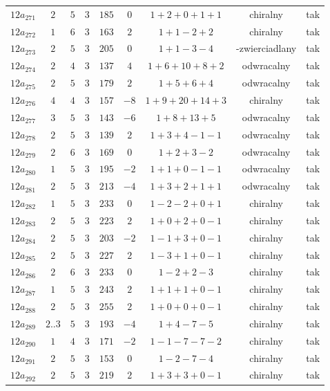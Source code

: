 \begin{longtable}{ccccccccc}
$12a_{271}$ & $2$ & $5$ & $3$ & $185$ & $0$ & $1+2+0+1+1$ & chiralny & tak \\
$12a_{272}$ & $1$ & $6$ & $3$ & $163$ & $2$ & $1+1-2+2$ & chiralny & tak \\
$12a_{273}$ & $2$ & $5$ & $3$ & $205$ & $0$ & $1+1-3-4$ & -zwierciadlany & tak \\
$12a_{274}$ & $2$ & $4$ & $3$ & $137$ & $4$ & $1+6+10+8+2$ & odwracalny & tak \\
$12a_{275}$ & $2$ & $5$ & $3$ & $179$ & $2$ & $1+5+6+4$ & odwracalny & tak \\
$12a_{276}$ & $4$ & $4$ & $3$ & $157$ & $-8$ & $1+9+20+14+3$ & chiralny & tak \\
$12a_{277}$ & $3$ & $5$ & $3$ & $143$ & $-6$ & $1+8+13+5$ & odwracalny & tak \\
$12a_{278}$ & $2$ & $5$ & $3$ & $139$ & $2$ & $1+3+4-1-1$ & odwracalny & tak \\
$12a_{279}$ & $2$ & $6$ & $3$ & $169$ & $0$ & $1+2+3-2$ & odwracalny & tak \\
$12a_{280}$ & $1$ & $5$ & $3$ & $195$ & $-2$ & $1+1+0-1-1$ & odwracalny & tak \\
$12a_{281}$ & $2$ & $5$ & $3$ & $213$ & $-4$ & $1+3+2+1+1$ & odwracalny & tak \\
$12a_{282}$ & $1$ & $5$ & $3$ & $233$ & $0$ & $1-2-2+0+1$ & chiralny & tak \\
$12a_{283}$ & $2$ & $5$ & $3$ & $223$ & $2$ & $1+0+2+0-1$ & chiralny & tak \\
$12a_{284}$ & $2$ & $5$ & $3$ & $203$ & $-2$ & $1-1+3+0-1$ & chiralny & tak \\
$12a_{285}$ & $2$ & $5$ & $3$ & $227$ & $2$ & $1-3+1+0-1$ & chiralny & tak \\
$12a_{286}$ & $2$ & $6$ & $3$ & $233$ & $0$ & $1-2+2-3$ & chiralny & tak \\
$12a_{287}$ & $1$ & $5$ & $3$ & $243$ & $2$ & $1+1+1+0-1$ & chiralny & tak \\
$12a_{288}$ & $2$ & $5$ & $3$ & $255$ & $2$ & $1+0+0+0-1$ & chiralny & tak \\
$12a_{289}$ & $2..3$ & $5$ & $3$ & $193$ & $-4$ & $1+4-7-5$ & chiralny & tak \\
$12a_{290}$ & $1$ & $4$ & $3$ & $171$ & $-2$ & $1-1-7-7-2$ & chiralny & tak \\
$12a_{291}$ & $2$ & $5$ & $3$ & $153$ & $0$ & $1-2-7-4$ & chiralny & tak \\
$12a_{292}$ & $2$ & $5$ & $3$ & $219$ & $2$ & $1+3+3+0-1$ & chiralny & tak \\

\end{longtable}
